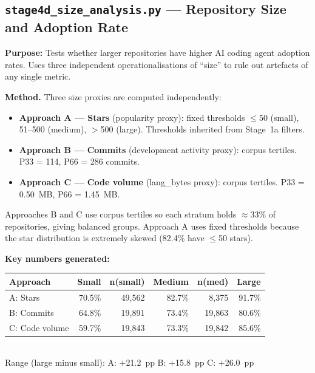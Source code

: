 \documentclass[11pt,a4paper]{article}
\begin{document}
\newpage

\subsection*{\texttt{stage4d\_size\_analysis.py} --- Repository Size and Adoption Rate}

\begin{infobox}
\textbf{Purpose:} Tests whether larger repositories have higher AI coding
agent adoption rates. Uses three independent operationalisations of
``size'' to rule out artefacts of any single metric.
\end{infobox}

\textbf{Method.}
Three size proxies are computed independently:
\begin{itemize}
  \item \textbf{Approach A --- Stars} (popularity proxy): fixed thresholds
        $\leq$50 (small), 51--500 (medium), $>$500 (large). Thresholds
        inherited from Stage~1a filters.
  \item \textbf{Approach B --- Commits} (development activity proxy):
        corpus tertiles. P33 = 114, P66 = 286 commits.
  \item \textbf{Approach C --- Code volume} (lang\_bytes proxy):
        corpus tertiles. P33 = 0.50~MB, P66 = 1.45~MB.
\end{itemize}
Approaches B and C use corpus tertiles so each stratum holds $\approx$33\%
of repositories, giving balanced groups. Approach A uses fixed thresholds
because the star distribution is extremely skewed (82.4\% have $\leq$50 stars).

\begin{numbersbox}
\textbf{Key numbers generated:}\\[2pt]
\begin{tabular}{@{}lrrrrr@{}}
\toprule
Approach & Small & n(small) & Medium & n(med) & Large \\
\midrule
A: Stars          & 70.5\% & 49,562 & 82.7\% & 8,375 & 91.7\% \\
B: Commits        & 64.8\% & 19,891 & 73.4\% & 19,863 & 80.6\% \\
C: Code volume    & 59.7\% & 19,843 & 73.3\% & 19,842 & 85.6\% \\
\bottomrule
\end{tabular}\\[4pt]
Range (large minus small): A: $+$21.2~pp \quad B: $+$15.8~pp \quad C: $+$26.0~pp
\end{numbersbox}
\end{document}
